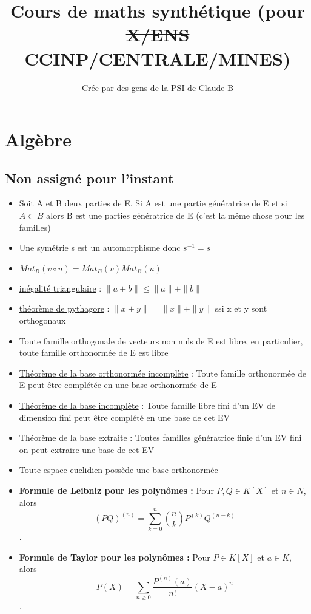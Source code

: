 \documentclass{article}
\title{Cours de maths synthétique (pour \sout{X/ENS} CCINP/CENTRALE/MINES)}
\author{Crée par des gens de la PSI de Claude B}
\begin{document}
\maketitle

\newpage

\tableofcontents

\newpage

\section{Algèbre}

\subsection{Non assigné pour l'instant}
\begin{itemize}[label=$\ast$]
	\item Soit A et B deux parties de E. Si A est une partie génératrice de E et si \( A \subset B \) alors B est une parties génératrice de E (c'est la même chose pour les familles)
	\item Une symétrie s est un automorphisme donc \(s^{-1} = s \)
	\item 	\( Mat_B(v \circ u) = Mat_B(v)Mat_B(u) \)
	\item \underline{inégalité triangulaire} : \( \|a + b\| \leq \|a\| + \|b\| \)
	\item \underline{théorème de pythagore} : \( \|x + y\| = \|x\| + \|y\| \) ssi x et y sont orthogonaux
	\item Toute famille orthogonale de vecteurs non nuls de E est libre, en particulier, toute famille orthonormée de E est libre
	\item \underline{Théorème de la base orthonormée incomplète} : Toute famille orthonormée de E peut être complétée en une base orthonormée de E
	\item \underline{Théorème de la base incomplète} : Toute famille libre fini d'un EV de dimension fini peut être complété en une base de cet EV
	\item \underline{Théorème de la base extraite} : Toutes familles génératrice finie d'un EV fini on peut extraire une base de cet EV
	\item Toute espace euclidien possède une base orthonormée
	\item \textbf{Formule de Leibniz pour les polynômes :} Pour \( P, Q \in K[X] \) et \( n \in N \), alors \[ (PQ)^{(n)} = \sum_{k=0}^{n} \binom{n}{k} P^{(k)}Q^{(n-k)} \].
	\item \textbf{Formule de Taylor pour les polynômes :} Pour \( P \in K[X] \) et \( a \in K \), alors \[ P(X) = \sum_{n \geq 0} \frac{P^{(n)}(a)}{n!}(X - a)^n \].

\end{itemize}
\end{document}
